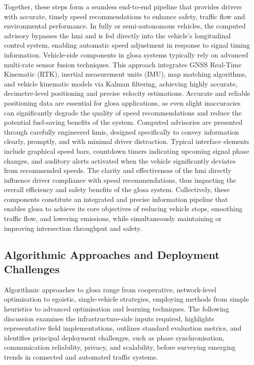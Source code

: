 Together, these steps form a seamless end-to-end pipeline that provides drivers with accurate, timely speed recommendations to enhance safety, traffic flow and environmental performance. In fully or semi-autonomous vehicles, the computed advisory bypasses the \ac{hmi} and is fed directly into the vehicle’s longitudinal control system, enabling automatic speed adjustment in response to signal timing information.
\mynewline
Vehicle-side components in \ac{glosa} systems typically rely on advanced multi-rate sensor fusion techniques. This approach integrates GNSS Real-Time Kinematic (RTK), inertial measurement units (IMU), \ac{map} matching algorithms, and vehicle kinematic models via Kalman filtering, achieving highly accurate, decimetre-level positioning and precise velocity estimations. Accurate and reliable positioning data are essential for \ac{glosa} applications, as even slight inaccuracies can significantly degrade the quality of speed recommendations and reduce the potential fuel-saving benefits of the system. \cite{Vignarca2023} Computed advisories are presented through carefully engineered \acp{hmi}, designed specifically to convey information clearly, promptly, and with minimal driver distraction. Typical interface elements include graphical speed bars, countdown timers indicating upcoming signal phase changes, and auditory alerts activated when the vehicle significantly deviates from recommended speeds. The clarity and effectiveness of the \ac{hmi} directly influence driver compliance with speed recommendations, thus impacting the overall efficiency and safety benefits of the \ac{glosa} system.
\mynewline
Collectively, these components constitute an integrated and precise information pipeline that enables \ac{glosa} to achieve its core objectives of reducing vehicle stops, smoothing traffic flow, and lowering emissions, while simultaneously maintaining or improving intersection throughput and safety.


\subsection{Algorithmic Approaches and Deployment Challenges}
\label{subsec:glosa_algorithms_challenges}

Algorithmic approaches to \ac{glosa} range from cooperative, network-level optimisation to egoistic, single-vehicle strategies, employing methods from simple heuristics to advanced optimisation and learning techniques. The following discussion examines the infrastructure-side inputs required, highlights representative field implementations, outlines standard evaluation metrics, and identifies principal deployment challenges, such as phase synchronisation, communication reliability, privacy, and scalability, before surveying emerging trends in connected and automated traffic systems.

